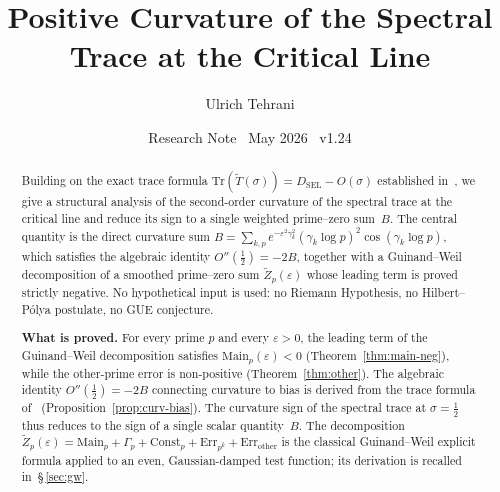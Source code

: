 \documentclass[11pt]{article}
\title{\vspace{-1.5em}\bfseries Positive Curvature of the Spectral Trace
at the Critical Line}
\author{Ulrich Tehrani}
\date{Research Note \textperiodcentered\ May 2026
      \textperiodcentered\ v1.24}
\newcommand{\Tt}{\widetilde{T}}
\newcommand{\DSEL}{D_{\mathrm{SEL}}}
\begin{document}
\maketitle

\begin{abstract}
Building on the exact trace formula $\mathrm{Tr}(\Tt(\sigma))=\DSEL-O(\sigma)$
established in~\cite{Paper5}, we give a structural analysis of the
second-order curvature of the spectral trace at the critical line
and reduce its sign to a single weighted prime--zero sum~$B$.
The central quantity is the direct curvature sum
$B=\sum_{k,p} e^{-\varepsilon^2\gamma_k^2}(\gamma_k\log p)^2\cos(\gamma_k\log p)$,
which satisfies the algebraic identity $O''(\tfrac12)=-2B$, together with a
Guinand--Weil decomposition of a smoothed prime--zero sum $\widetilde Z_p(\varepsilon)$
whose leading term is proved strictly negative.
No hypothetical input is used: no Riemann Hypothesis, no Hilbert--P\'olya
postulate, no GUE conjecture.

\textbf{What is proved.}
For every prime $p$ and every $\varepsilon>0$, the leading term of the
Guinand--Weil decomposition satisfies
$\mathrm{Main}_p(\varepsilon)<0$ (Theorem~\ref{thm:main-neg}), while the
other-prime error is non-positive (Theorem~\ref{thm:other}).
The algebraic identity $O''(\tfrac12)=-2B$ connecting curvature to bias
is derived from the trace formula of~\cite{Paper5}
(Proposition~\ref{prop:curv-bias}).
The curvature sign of the spectral trace at $\sigma=\tfrac12$
thus reduces to the sign of a single scalar quantity~$B$.
The decomposition
$\widetilde Z_p(\varepsilon)=\mathrm{Main}_p+\Gamma_p+\mathrm{Const}_p
+\mathrm{Err}_{p^k}+\mathrm{Err}_{\mathrm{other}}$
is the classical Guinand--Weil explicit formula applied to an even,
Gaussian-damped test function; its derivation is recalled in~\S\,\ref{sec:gw}.


\end{abstract}
\end{document}
